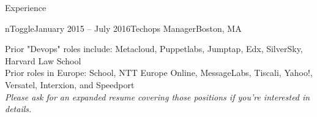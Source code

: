 \documentclass{resume} %
\begin{document}
\begin{rSection}{Experience}
\begin{rSubsection}{nToggle}{January 2015 -- July 2016}{Techops Manager}{Boston, MA}
\end{rSubsection}

\begin{center}
Prior "Devops" roles include: Metacloud, Puppetlabs, Jumptap, Edx, SilverSky, Harvard Law School\\
Prior roles in Europe: School, NTT Europe Online, MessageLabs, Tiscali, Yahoo!, Versatel, Interxion, and Speedport\\
\textit{Please ask for an expanded resume covering those positions if you're interested in details.}
\end{center}

\end{rSection}
\end{document}
